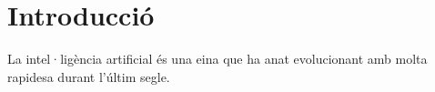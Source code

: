 \chapter{Introducció}
\label{c:intro}

La intel·ligència artificial és una eina que ha anat evolucionant amb molta rapidesa durant l'últim segle.
